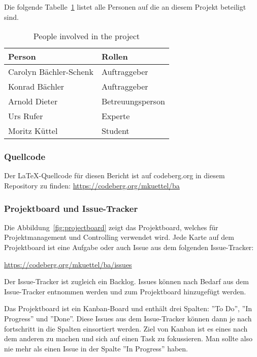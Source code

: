 Die folgende Tabelle~\ref{tab:projectmembers} listet alle Personen auf die an diesem Projekt beteiligt sind.

\begin{table}[H]
    \begin{tabular}{l p{3.2cm}}
        \toprule
        \bfseries Person   & \bfseries Rollen \\
        \midrule
        Carolyn Bächler-Schenk    & Auftraggeber \\
        \midrule
        Konrad Bächler     & Auftraggeber \\
        \midrule
        Arnold Dieter      & Betreuungsperson \\
        \midrule
        Urs Rufer          & Experte \\
        \midrule
        Moritz Küttel      & Student \\
        \bottomrule
    \end{tabular}
    \caption{People involved in the project}\label{tab:projectmembers}
\end{table}

\subsubsection{Quellcode}

Der \LaTeX-Quellcode für diesen Bericht ist auf codeberg.org in diesem Repository zu finden:
\url{https://codeberg.org/mkuettel/ba}


\subsubsection{Projektboard und Issue-Tracker}

Die Abbildung~\ref{fig:projectboard} zeigt das Projektboard, welches für Projektmanagement und Controlling verwendet wird.
Jede Karte auf dem Projektboard ist eine Aufgabe oder auch Issue aus dem folgenden Issue-Tracker:

\url{https://codeberg.org/mkuettel/ba/issues}

Der Issue-Tracker ist zugleich ein Backlog. Issues können nach Bedarf aus dem Issue-Tracker entnommen werden und zum Projektboard hinzugefügt werden.

Das Projektboard ist ein Kanban-Board und enthält drei Spalten: ''To Do'', ''In Progress'' und ''Done''.
Diese Issues aus dem Issue-Tracker können dann je nach fortschritt in die Spalten einsortiert werden. 
Ziel von Kanban ist es eines nach dem anderen zu machen und sich auf einen Task zu fokussieren. Man sollte also nie mehr als einen Issue in der Spalte ''In Progress'' haben.

